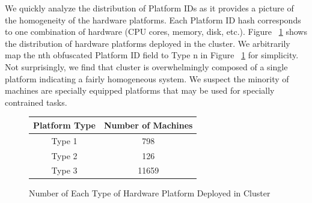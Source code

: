 \documentclass{sig-alternate}
\begin{document}
We quickly analyze the distribution of Platform IDs as it provides a picture of the homogeneity of the hardware platforms.
Each Platform ID hash corresponds to one combination of hardware (CPU cores, memory, disk, etc.).
Figure ~\ref{platform_dist} shows the distribution of hardware platforms deployed in the cluster.
We arbitrarily map the nth obfuscated Platform ID field to Type n in Figure ~\ref{platform_dist} for simplicity.
Not surprisingly, we find that cluster is overwhelmingly composed of a single platform indicating a fairly homogeneous system.
We suspect the minority of machines are specially equipped platforms that may be used for specially contrained tasks.

\begin{figure}
\centering
\begin{tabular}{| c | c |} \hline
Platform Type & Number of Machines\\ \hline
Type 1 & 798\\ \hline
Type 2 & 126\\ \hline
Type 3 & 11659 \\ \hline
\end{tabular}
\label{platform_dist}
\caption{Number of Each Type of Hardware Platform Deployed in Cluster}
\end{figure}




\end{document}
